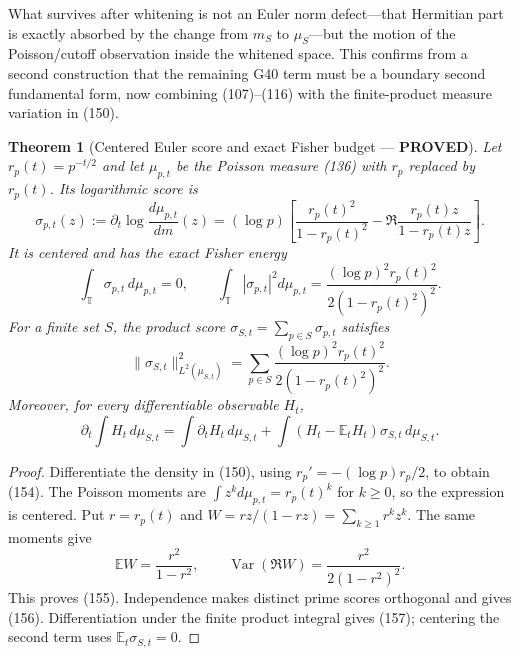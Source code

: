 \documentclass[11pt]{article}
\newtheorem{theorem}{Theorem}
\newcommand{\PROVED}{\textcolor{green!45!black}{\textbf{PROVED}}}
\begin{document}
What survives after whitening is not an Euler norm defect---that Hermitian
part is exactly absorbed by the change from $m_S$ to $\mu_S$---but the motion
of the Poisson/cutoff observation inside the whitened space.  This confirms
from a second construction that the remaining G40 term must be a boundary
second fundamental form, now combining (107)--(116) with the finite-product
measure variation in (150).

\begin{theorem}[Centered Euler score and exact Fisher budget --- \PROVED]
Let $r_p(t)=p^{-t/2}$ and let $\mu_{p,t}$ be the Poisson measure (136) with
$r_p$ replaced by $r_p(t)$.  Its logarithmic score is
\begin{equation}
 \sigma_{p,t}(z):=\partial_t\log\frac{d\mu_{p,t}}{dm}(z)
 =(\log p)\left[
 \frac{r_p(t)^2}{1-r_p(t)^2}
 -\Re\frac{r_p(t)z}{1-r_p(t)z}
 \right].                                              \tag{154}
\end{equation}
It is centered and has the exact Fisher energy
\begin{equation}
 \int_{\mathbb T}\sigma_{p,t}\,d\mu_{p,t}=0,
 \qquad
 \int_{\mathbb T}|\sigma_{p,t}|^2d\mu_{p,t}
 =\frac{(\log p)^2r_p(t)^2}
        {2(1-r_p(t)^2)^2}.                             \tag{155}
\end{equation}
For a finite set $S$, the product score
$\sigma_{S,t}=\sum_{p\in S}\sigma_{p,t}$ satisfies
\begin{equation}
 \|\sigma_{S,t}\|_{L^2(\mu_{S,t})}^2
 =\sum_{p\in S}\frac{(\log p)^2r_p(t)^2}
        {2(1-r_p(t)^2)^2}.                             \tag{156}
\end{equation}
Moreover, for every differentiable observable $H_t$,
\begin{equation}
 \partial_t\int H_t\,d\mu_{S,t}
 =\int\partial_tH_t\,d\mu_{S,t}
  +\int(H_t-\mathbb E_tH_t)\sigma_{S,t}\,d\mu_{S,t}. \tag{157}
\end{equation}
\end{theorem}

\begin{proof}
Differentiate the density in (150), using
$r_p'=-(\log p)r_p/2$, to obtain (154).  The Poisson moments are
$\int z^k d\mu_{p,t}=r_p(t)^k$ for $k\ge0$, so the expression is centered.
Put $r=r_p(t)$ and $W=rz/(1-rz)=\sum_{k\ge1}r^kz^k$.
The same moments give
\[
 \mathbb EW=\frac{r^2}{1-r^2},\qquad
 \operatorname{Var}(\Re W)=\frac{r^2}{2(1-r^2)^2}.
\]
This proves (155).  Independence makes distinct prime scores orthogonal and
gives (156).  Differentiation under the finite product integral gives (157);
centering the second term uses $\mathbb E_t\sigma_{S,t}=0$.
\end{proof}
\end{document}
